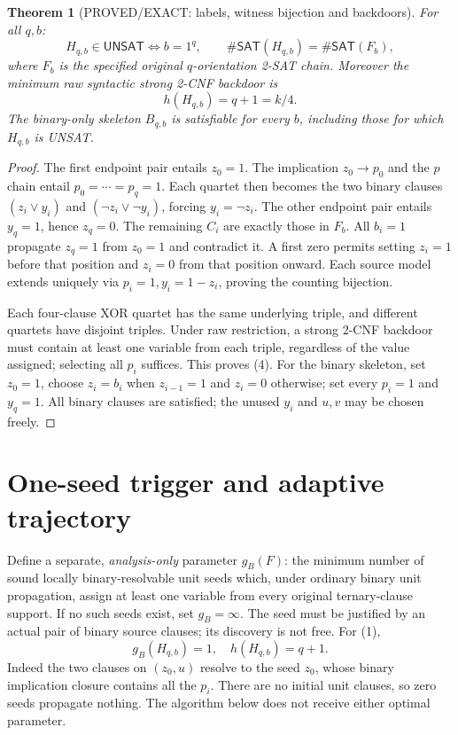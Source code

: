 \documentclass[11pt]{article}
\newtheorem{theorem}{Theorem}
\newcommand{\SAT}{\mathsf{SAT}}
\newcommand{\UNSAT}{\mathsf{UNSAT}}
\begin{document}
\begin{theorem}[PROVED/EXACT: labels, witness bijection and backdoors]
For all $q,b$:
\[
H_{q,b}\in\UNSAT\iff b=1^q,\qquad
\#\SAT(H_{q,b})=\#\SAT(F_b),
\tag{3}
\]
where $F_b$ is the specified original $q$-orientation 2-SAT chain.
Moreover the minimum \emph{raw syntactic strong} 2-CNF backdoor is
\[
\boxed{h(H_{q,b})=q+1=k/4.}\tag{4}
\]
The binary-only skeleton $B_{q,b}$ is satisfiable for \emph{every}
$b$, including those for which $H_{q,b}$ is UNSAT.
\end{theorem}
\begin{proof}
The first endpoint pair entails $z_0=1$. The implication
$z_0\to p_0$ and the $p$ chain entail $p_0=\cdots=p_q=1$.
Each quartet then becomes the two binary clauses
$(z_i\vee y_i)$ and $(\neg z_i\vee\neg y_i)$, forcing
$y_i=\neg z_i$. The other endpoint pair entails $y_q=1$,
hence $z_q=0$. The remaining $C_i$ are exactly those in $F_b$.
All $b_i=1$ propagate $z_q=1$ from $z_0=1$ and contradict it.
A first zero permits setting $z_i=1$ before that position and
$z_i=0$ from that position onward. Each source model extends
uniquely via $p_i=1,y_i=1-z_i$, proving the counting bijection.

Each four-clause XOR quartet has the same underlying triple, and
different quartets have disjoint triples. Under raw restriction, a
strong 2-CNF backdoor must contain at least one variable from each
triple, regardless of the value assigned; selecting all $p_i$ suffices.
This proves (4). For the binary skeleton, set $z_0=1$, choose
$z_i=b_i$ when $z_{i-1}=1$ and $z_i=0$ otherwise; set every $p_i=1$
and $y_q=1$. All binary clauses are satisfied; the unused $y_i$ and
$u,v$ may be chosen freely.
\end{proof}

\section{One-seed trigger and adaptive trajectory}
Define a separate, \emph{analysis-only} parameter $g_B(F)$: the
minimum number of sound locally binary-resolvable unit seeds which,
under ordinary binary unit propagation, assign at least one variable
from every original ternary-clause support. If no such seeds exist,
set $g_B=\infty$. The seed must be justified by an actual pair of
binary source clauses; its discovery is not free. For (1),
\[
\boxed{g_B(H_{q,b})=1,\quad h(H_{q,b})=q+1.}\tag{5}
\]
Indeed the two clauses on $(z_0,u)$ resolve to the seed $z_0$,
whose binary implication closure contains all the $p_i$.
There are no initial unit clauses, so zero seeds propagate nothing.
The algorithm below does not receive either optimal parameter.
\end{document}
